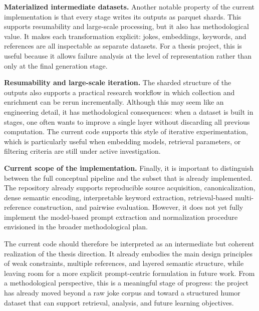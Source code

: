 \documentclass[11pt]{article}
\begin{document}
\textbf{Materialized intermediate datasets.} Another notable property of the current implementation is that every stage writes its outputs as parquet shards. This supports resumability and large-scale processing, but it also has methodological value. It makes each transformation explicit: jokes, embeddings, keywords, and references are all inspectable as separate datasets. For a thesis project, this is useful because it allows failure analysis at the level of representation rather than only at the final generation stage.

\textbf{Resumability and large-scale iteration.} The sharded structure of the outputs also supports a practical research workflow in which collection and enrichment can be rerun incrementally. Although this may seem like an engineering detail, it has methodological consequences: when a dataset is built in stages, one often wants to improve a single layer without discarding all previous computation. The current code supports this style of iterative experimentation, which is particularly useful when embedding models, retrieval parameters, or filtering criteria are still under active investigation.

\textbf{Current scope of the implementation.} Finally, it is important to distinguish between the full conceptual pipeline and the subset that is already implemented. The repository already supports reproducible source acquisition, canonicalization, dense semantic encoding, interpretable keyword extraction, retrieval-based multi-reference construction, and pairwise evaluation. However, it does not yet fully implement the model-based prompt extraction and normalization procedure envisioned in the broader methodological plan.

The current code should therefore be interpreted as an intermediate but coherent realization of the thesis direction. It already embodies the main design principles of weak constraints, multiple references, and layered semantic structure, while leaving room for a more explicit prompt-centric formulation in future work. From a methodological perspective, this is a meaningful stage of progress: the project has already moved beyond a raw joke corpus and toward a structured humor dataset that can support retrieval, analysis, and future learning objectives.
\end{document}
